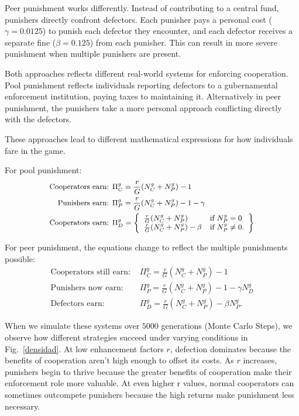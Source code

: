 Peer punishment works differently. Instead of contributing to a central fund, punishers directly confront defectors. Each punisher pays a personal cost ($\gamma=0.0125$) to punish each defector they encounter, and each defector receives a separate fine ($\beta=0.125$) from each punisher. This can result in more severe punishment when multiple punishers are present.

Both approaches reflects different real-world systems for enforcing cooperation. Pool punishment reflects individuals reporting defectors to a gubernamental enforcement institution, paying taxes to maintaining it. Alternatively in peer punishment, the punishers take a more personal approach conflicting directly with the defectors.


These approaches lead to different mathematical expressions for how individuals fare in the game.

For pool punishment:
\begin{equation}\small
\begin{split}
\text{Cooperators earn: } &\Pi_C^g=\frac{r}{G}(N_C^g+N_P^g)-1 \\
\text{Punishers earn: } &\Pi_P^g=\frac{r}{G}(N_C^g+N_P^g)-1-\gamma \\
\text{Cooperators earn: } &\Pi_D^g = \left\{ \begin{array}{ll}
\frac{r}{G}(N_C^g+N_P^g) & \mbox{if $N_P^g=0$} \\
\frac{r}{G}(N_C^g+N_P^g)-\beta & \mbox{if $N_P^g\neq0$}.
\end{array}
\right\}
\end{split}
\end{equation}


For peer punishment, the equations change to reflect the multiple punishments possible:
\begin{equation}
\begin{split}
\text{Cooperators still earn: } &\Pi_C^g=\frac{r}{G}(N_C^g+N_P^g)-1 \\
\text{Punishers now earn: } &\Pi_P^g=\frac{r}{G}(N_C^g+N_P^g)-1-\gamma N_D^g \\
\text{Defectors earn: } &\Pi_D^g=\frac{r}{G}(N_C^g+N_P^g)-\beta N_P^g.
\end{split}    
\end{equation}



When we simulate these systems over $5000$ generations (Monte Carlo Steps), we observe how different strategies succeed under varying conditions in Fig.~\ref{densidad}. At low enhancement factors $r$, defection dominates because the benefits of cooperation aren't high enough to offset its costs. As $r$ increases, punishers begin to thrive because the greater benefits of cooperation make their enforcement role more valuable. At even higher r values, normal cooperators can sometimes outcompete punishers because the high returns make punishment less necessary.

